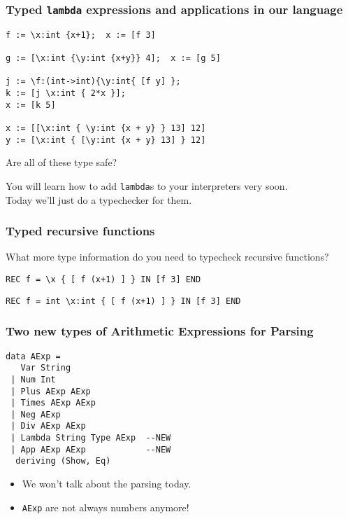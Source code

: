 \documentclass{beamer}
\begin{document}
\begin{frame}[fragile]
\frametitle{Typed {\tt lambda} expressions and applications in our language}

\begin{verbatim}
f := \x:int {x+1};  x := [f 3]   
         
g := [\x:int {\y:int {x+y}} 4];  x := [g 5]

j := \f:(int->int){\y:int{ [f y] };
k := [j \x:int { 2*x }];
x := [k 5]

x := [[\x:int { \y:int {x + y} } 13] 12]
y := [\x:int { [\y:int {x + y} 13] } 12]

\end{verbatim}
\pause
Are all of these type safe?

\pause
You will learn how to add {\tt lambda}s to your 
interpreters very soon.\\ Today we'll just do a typechecker for them.
\end{frame}

\begin{frame}[fragile]
\frametitle{Typed recursive functions}
What more type information do you need to typecheck recursive functions?
\begin{verbatim}
REC f = \x { [ f (x+1) ] } IN [f 3] END
\end{verbatim}

\pause
\begin{verbatim}
REC f = int \x:int { [ f (x+1) ] } IN [f 3] END
\end{verbatim}
\end{frame}

\begin{frame}[fragile]
\frametitle{Two new types of Arithmetic Expressions for Parsing}
\begin{verbatim}
data AExp =
   Var String
 | Num Int
 | Plus AExp AExp
 | Times AExp AExp 
 | Neg AExp
 | Div AExp AExp
 | Lambda String Type AExp  --NEW
 | App AExp AExp            --NEW
  deriving (Show, Eq)
\end{verbatim}

\vfill
\begin{itemize}
\item
We won't talk about the parsing today.
\item
{\tt AExp} are not always numbers anymore!
\end{itemize}
\end{frame}
\end{document}
